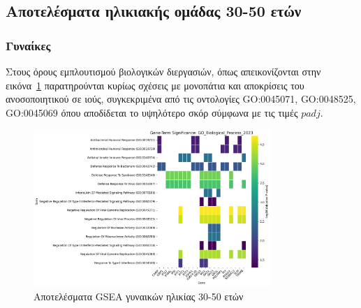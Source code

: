 \documentclass[12pt]{report}
\begin{document}
        \subsection{Αποτελέσματα ηλικιακής ομάδας 30-50 ετών}
            \par
            \subsubsection{Γυναίκες}
                \par
                    Στους όρους εμπλουτισμού βιολογικών διεργασιών, όπως απεικονίζονται στην εικόνα~\ref{fig:gsea_results_Female_30-50_GO_Biological_Process_2023_heatmap} παρατηρούνται κυρίως σχέσεις με μονοπάτια και αποκρίσεις του ανοσοποιητικού σε ιούς, συγκεκριμένα από τις οντολογίες GO:0045071, GO:0048525, GO:0045069 όπου αποδίδεται το υψηλότερο σκόρ σύμφωνα με τις τιμές $padj$.
                \begin{figure}[H]
                    \centering
                    \includegraphics[width=0.8\textwidth]{GSEA/Females/30-50/gsea_results_Female_30-50_GO_Biological_Process_2023_heatmap.png}
                    \caption{Αποτελέσματα GSEA γυναικών ηλικίας 30-50 ετών}
                    \label{fig:gsea_results_Female_30-50_GO_Biological_Process_2023_heatmap}
                \end{figure}
\end{document}
